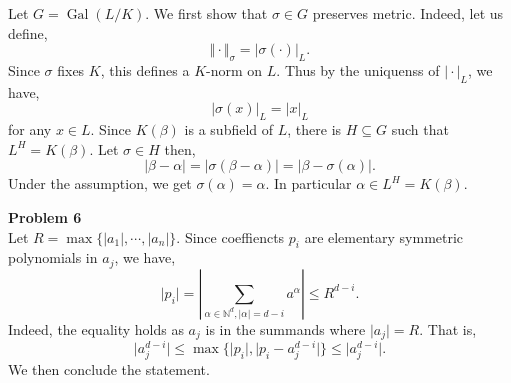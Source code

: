 \documentclass[10pt]{article}
\DeclareMathOperator{\Gal}{Gal}
\newcommand{\norm}[1]{\Vert #1 \Vert}
\newcommand{\N}[0]{\mathbb{N}}
\newcommand{\ab}[1]{\vert #1 \vert}
\begin{document}
Let $G=\Gal(L/K)$. We first show that $\sigma\in G$ preserves metric. Indeed, let us define,
\begin{equation*}
\norm{\cdot}_\sigma = \ab{\sigma(\cdot)}_L.
\end{equation*}
Since $\sigma$ fixes $K$, this defines a $K$-norm on $L$. Thus by the uniquenss of $\ab{\cdot}_L$, we have,
\begin{equation*}
    \ab{\sigma(x)}_L = \ab{x}_L
\end{equation*}
for any $x\in L$. Since $K(\beta)$ is a subfield of $L$, there is $H\subseteq G$ such that $L^H = K(\beta)$. Let $\sigma\in H$ then,
\begin{equation*}
    \ab{\beta-\alpha}=\ab{\sigma(\beta-\alpha)} = \ab{\beta-\sigma(\alpha)} .
\end{equation*}
Under the assumption, we get $\sigma(\alpha) = \alpha$. In particular $\alpha\in L^H = K(\beta)$.
\par\textbf{Problem 6}\\
Let $R = \max\{\ab{a_1},\cdots,\ab{a_n}\}$. Since coeffiencts $p_i$ are elementary symmetric polynomials in $a_j$, we have,
\begin{equation*}
    \ab{p_i} =\left\vert\sum_{\alpha\in\N^d, \ab{\alpha}=d-i}a^\alpha\right\vert \leq R^{d-i}.
\end{equation*}
Indeed, the equality holds as $a_j$ is in the summands where $\ab{a_j}=R$. That is, 
\begin{equation*}
    \ab{a_j^{d-i}}\leq \max\{\ab{p_i},\ab{p_i-a_j^{d-i}}\}\leq \ab{a_j^{d-i}}.
\end{equation*}
We then conclude the statement.
\end{document}
